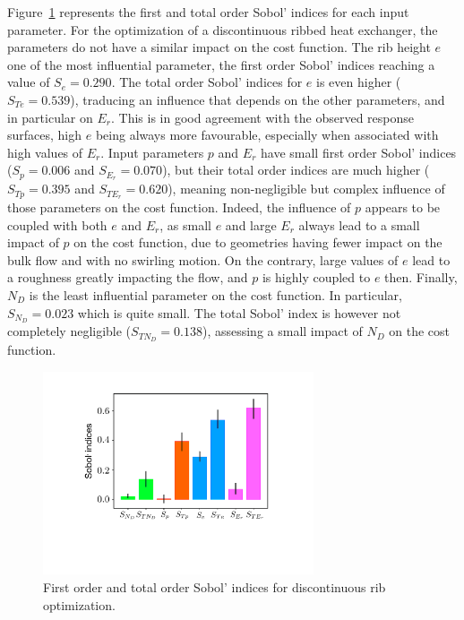 Figure~\ref{sensitivity} represents the first and total order Sobol' indices for each input parameter. For the optimization of a discontinuous ribbed heat exchanger, the parameters do not have a similar impact on the cost function. The rib height $e$ one of the most influential parameter, the first order Sobol' indices reaching a value of $S_e = 0.290$. The total order Sobol' indices for $e$ is even higher ($S_{Te} = 0.539$), traducing an influence that depends on the other parameters, and in particular on $E_r$. This is in good agreement with the observed response surfaces, high $e$ being always more favourable, especially when associated with high values of $E_r$. Input parameters $p$ and $E_r$ have small first order Sobol' indices ($S_p = 0.006$ and $S_{E_r} = 0.070$), but their total order indices are much higher ($S_{Tp} = 0.395$ and $S_{TE_r} = 0.620$), meaning non-negligible but complex influence of those parameters on the cost function. Indeed, the influence of $p$ appears to be coupled with both $e$ and $E_r$, as small $e$ and large $E_r$ always lead to a small impact of $p$ on the cost function, due to geometries having fewer impact on the bulk flow and with no swirling motion. On the contrary, large values of $e$ lead to a roughness greatly impacting the flow, and $p$ is highly coupled to $e$ then. Finally, $N_D$ is the least influential parameter on the cost function. In particular, $S_{N_D} = 0.023$ which is quite small. The total Sobol' index is however not completely negligible ($S_{TN_D} = 0.138$), assessing a small impact of $N_D$ on the cost function.\\

\begin{figure}[ht]
\centering
\includegraphics[width=8cm]{fig/applications/optim/Sobol_discontinu.pdf}
\caption{First order and total order Sobol' indices for discontinuous rib optimization.}
\label{sensitivity}
\end{figure}

